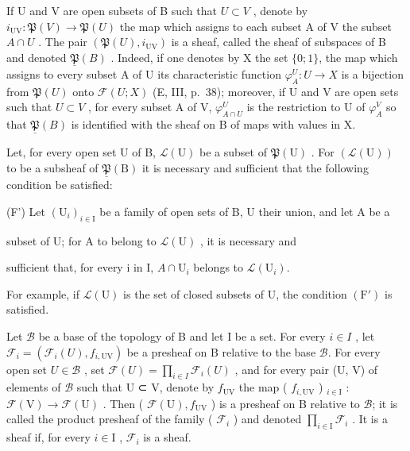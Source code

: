 
If U and V are open subsets of B such that \(U \subset V\) , denote by \(i_{\mathrm{UV}}: \mathfrak{P}(V) \to \mathfrak{P}(U)\) the map which assigns to each subset A of V the subset \(A \cap U\) . The pair \((\mathfrak{P}(U), i_{\mathrm{UV}})\) is a sheaf, called the sheaf of subspaces of B and denoted \(\underline{\mathfrak{P}}(B)\) . Indeed, if one denotes by X the set \(\{0;1\}\), the map which assigns to every subset A of U its characteristic function \(\varphi_{A}^{U}: U \to X\) is a bijection from \(\mathfrak{P}(U)\) onto \(\mathcal{F}(U;X)\) (E, III, p.~38); moreover, if U and V are open sets such that \(U \subset V\) , for every subset A of V, \(\varphi_{A \cap U}^{U}\) is the restriction to U of \(\varphi_{A}^{V}\) so that \(\underline{\mathfrak{P}}(B)\) is identified with the sheaf on B of maps with values in X.

Let, for every open set U of B, \(\mathcal{L}(\mathrm{U})\) be a subset of \(\mathfrak{P}(\mathrm{U})\) . For \((\mathcal{L}(\mathrm{U}))\) to be a subsheaf of \(\underline{\mathfrak{P}}(\mathrm{B})\) it is necessary and sufficient that the following condition be satisfied:

(F') Let \((\mathrm{U}_{i})_{i\in\mathrm{I}}\) be a family of open sets of B, U their union, and let A be a

subset of U; for A to belong to \(\mathcal{L}(\mathrm{U})\) , it is necessary and

sufficient that, for every i in I, \(A \cap \mathrm{U}_{i}\) belongs to \(\mathcal{L}(\mathrm{U}_{i})\).

For example, if \(\mathcal{L}(\mathrm{U})\) is the set of closed subsets of U, the condition \((\mathrm{F}')\) is satisfied.


Let \(\mathcal{B}\) be a base of the topology of B and let I be a set. For every \(i \in I\) , let \(\mathcal{F}_{i} = (\mathcal{F}_{i}(U), f_{i,\mathrm{UV}})\) be a presheaf on B relative to the base \(\mathcal{B}\). For every open set \(U \in \mathcal{B}\) , set \(\mathcal{F}(U) = \prod_{i \in I} \mathcal{F}_{i}(U)\) , and for every pair (U, V) of elements of \(\mathcal{B}\) such that U ⊂ V, denote by \(f_{\mathrm{UV}}\) the map ( \(f_{i,\mathrm{UV}}\) ) \(_{i\in\mathrm{I}}\) : \(\mathcal{F}(\mathrm{V}) \to \mathcal{F}(\mathrm{U})\) . Then ( \(\mathcal{F}(\mathrm{U}), f_{\mathrm{UV}} \) ) is a presheaf on B relative to \(\mathcal{B}\); it is called the product presheaf of the family ( \(\mathcal{F}_i\) ) and denoted \(\prod_{i\in\mathrm{I}}\mathcal{F}_i\) . It is a sheaf if, for every \(i \in \mathrm{I}\) , \(\mathcal{F}_i\) is a sheaf.

